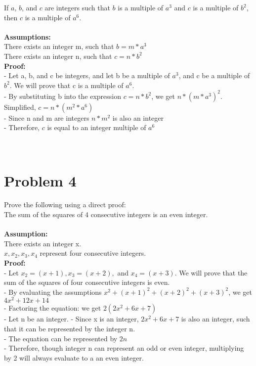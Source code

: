 \documentclass{amsart}
\theoremstyle{definition}
\theoremstyle{Exercise}
\theoremstyle{remark}
\theoremstyle{rule}
\numberwithin{equation}{section}
\begin{document}
If $a$, $b$, and $c$ are integers such that $b$ is a multiple of $a^3$ and $c$ is a multiple of $b^2$, then $c$ is a multiple of $a^6$.
\\\\
\textbf{Assumptions:}\\
There exists an integer m, such that $b = m * a^3$\\
There exists an integer n, such that $c = n * b^2$\\
\textbf{Proof:}\\
- Let a, b, and c be integers, and let b be a multiple of $a^3$, and c be a multiple of $b^2$. We will prove that c is a multiple of $a^6$.\\
- By substituting b into the expression $c = n * b^2$, we get $n * (m * a^3)^2$. Simplified, $c = n * (m^2 * a^6)$\\
- Since n and m are integers $n*m^2$ is also an integer\\
- Therefore, $c$ is equal to an integer multiple of $a^6$ \qedsymbol\\
\\\\
 \newpage
\vspace*{0.5in}
\section*{Problem 4}
Prove the following using a direct proof:
\\

The sum of the squares of 4 consecutive integers is an even integer.
\\\\
\textbf{Assumption:}\\
There exists an integer x.\\
$x, x_2, x_3, x_4$ represent four consecutive integers.\\
\textbf{Proof:}\\
- Let $x_2 = (x+1), x_3 = (x+2),$ and $x_4 = (x+3)$. We will prove that the sum of the squares of four consecutive integers is even.\\
- By evaluating the assumptions $x^2 + (x+1)^2 + (x+2)^2 + (x+3)^2$, we get $4x^2 + 12x + 14$\\
- Factoring the equation: we get $2(2x^2 + 6x + 7)$\\
- Let n be an integer.
- Since x is an integer, $2x^2 + 6x + 7$ is also an integer, such that it can be represented by the integer n.\\
- The equation can be represented by $2n$\\
- Therefore, though integer n can represent an odd or even integer, multiplying by 2 will always evaluate to a an even integer. \qedsymbol
\\\\
\end{document}
